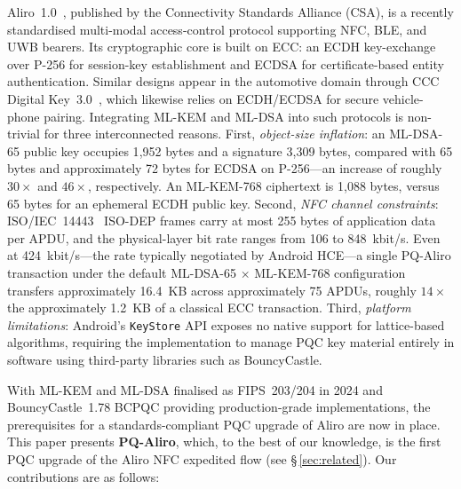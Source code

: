 \documentclass[runningheads]{llncs}
\begin{document}
Aliro~1.0~\cite{CSA:Aliro10}, published by the Connectivity Standards Alliance (CSA), is a recently standardised multi-modal access-control protocol supporting NFC, BLE, and UWB bearers. Its cryptographic core is built on ECC: an ECDH key-exchange over P-256 for session-key establishment and ECDSA for certificate-based entity authentication. Similar designs appear in the automotive domain through CCC Digital Key~3.0~\cite{CCC:DigKey3}, which likewise relies on ECDH/ECDSA for secure vehicle-phone pairing. Integrating ML-KEM and ML-DSA into such protocols is non-trivial for three interconnected reasons. First, \emph{object-size inflation}: an ML-DSA-65 public key occupies 1{,}952 bytes and a signature 3{,}309 bytes, compared with 65 bytes and approximately 72 bytes for ECDSA on P-256---an increase of roughly $30\times$ and $46\times$, respectively. An ML-KEM-768 ciphertext is 1{,}088 bytes, versus 65 bytes for an ephemeral ECDH public key. Second, \emph{NFC channel constraints}: ISO/IEC~14443~\cite{ISOIEC14443} ISO-DEP frames carry at most 255 bytes of application data per APDU, and the physical-layer bit rate ranges from 106 to 848~kbit/s. Even at 424~kbit/s---the rate typically negotiated by Android HCE---a single PQ-Aliro transaction under the default ML-DSA-65 $\times$ ML-KEM-768 configuration transfers approximately 16.4~KB across approximately 75 APDUs, roughly $14\times$ the approximately 1.2~KB of a classical ECC transaction. Third, \emph{platform limitations}: Android's \texttt{KeyStore} API exposes no native support for lattice-based algorithms, requiring the implementation to manage PQC key material entirely in software using third-party libraries such as BouncyCastle.

With ML-KEM and ML-DSA finalised as FIPS~203/204 in 2024 and BouncyCastle~1.78 BCPQC providing production-grade implementations, the prerequisites for a standards-compliant PQC upgrade of Aliro are now in place. This paper presents \textbf{PQ-Aliro}, which, to the best of our knowledge, is the first PQC upgrade of the Aliro NFC expedited flow (see \S\,\ref{sec:related}). Our contributions are as follows:
\end{document}
